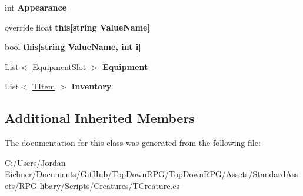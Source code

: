 \begin{DoxyCompactItemize}
\item 
\hypertarget{class_t_creature_ab7b3de27c987823c26de7ddde777965f}{}int {\bfseries Appearance}\label{class_t_creature_ab7b3de27c987823c26de7ddde777965f}

\item 
\hypertarget{class_t_creature_aa66e0648f3eb3946247d65b253d3102d}{}override float {\bfseries this\mbox{[}string Value\+Name\mbox{]}}\label{class_t_creature_aa66e0648f3eb3946247d65b253d3102d}

\item 
\hypertarget{class_t_creature_adcdd20275c79dc8b542e1c945135523f}{}bool {\bfseries this\mbox{[}string Value\+Name, int i\mbox{]}}\label{class_t_creature_adcdd20275c79dc8b542e1c945135523f}

\item 
\hypertarget{class_t_creature_a4ee1294c6f08b7fa6e71ec3bc88694c1}{}List$<$ \hyperlink{struct_t_creature_1_1_equipment_slot}{Equipment\+Slot} $>$ {\bfseries Equipment}\label{class_t_creature_a4ee1294c6f08b7fa6e71ec3bc88694c1}

\item 
\hypertarget{class_t_creature_a7aa47ddea4d58f4e205203861e46617c}{}List$<$ \hyperlink{class_t_item}{T\+Item} $>$ {\bfseries Inventory}\label{class_t_creature_a7aa47ddea4d58f4e205203861e46617c}

\end{DoxyCompactItemize}
\subsection*{Additional Inherited Members}


The documentation for this class was generated from the following file\+:\begin{DoxyCompactItemize}
\item 
C\+:/\+Users/\+Jordan Eichner/\+Documents/\+Git\+Hub/\+Top\+Down\+R\+P\+G/\+Top\+Down\+R\+P\+G/\+Assets/\+Standard\+Assets/\+R\+P\+G libary/\+Scripts/\+Creatures/T\+Creature.\+cs\end{DoxyCompactItemize}
